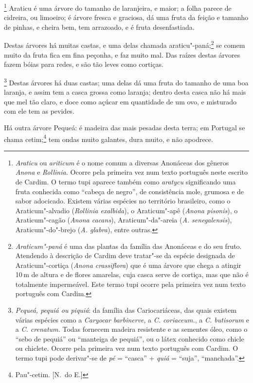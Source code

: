 \footnote{ \textit{Araticu} ou \textit{ariticum} é o
nome comum a diversas Anonáceas dos gêneros \textit{Anona} e 
\textit{Rollinia.} Ocorre pela primeira vez num texto português neste
escrito de Cardim. O termo tupi aparece também como \textit{aratycu}
significando uma fruta conhecida como ``cabeça de negro'', de
consistência mole, grumosa e de sabor adocicado. Existem várias
espécies no território brasileiro, como o Araticum"-alvadio
(\textit{Rollinia exalbida}), o Araticum"-apê (\textit{Anona pisonis}), 
o Araticum"-cagão (\textit{Anona cacans}), Araticum"-da"-areia
(\textit{A. senegalensis}), Araticum"-do"-brejo (\textit{A. glabra}), 
entre outras.} Araticu é uma árvore do tamanho de
laranjeira, e maior; a folha parece de cidreira, ou limoeiro; é árvore
fresca e graciosa, dá uma fruta da feição e tamanho de pinhas, e cheira
bem, tem arrazoado, e é fruta desenfastiada.

 Destas árvores há muitas castas, e uma delas chamada 
araticu"-paná;\footnote{ \textit{Araticum"-paná} é uma das plantas da família das
Anonáceas e do seu fruto. Atendendo à descrição de Cardim deve
tratar"-se da espécie designada de Araticum"-cortiça (\textit{Anona
crassiflora}) que é uma árvore que chega a atingir 10\,m de altura e de
flores amarelas, cuja casca serve de cortiça, mas que não é totalmente
impermeável. Este termo tupi ocorre pela primeira vez num texto
português com Cardim.} se comem muito da fruta fica em fina peçonha, e
faz muito mal. Das raízes destas árvores fazem bóias para redes, e são
tão leves como cortiças.

\footnote{ \textit{Pequeá, pequiá ou piquiá}: da
família das Cariocariáceas, das quais existem várias espécies como a 
\textit{Caryocar barbinerve}, a \textit{C. coriaceum.}, a \textit{C.
butisorum} e a \textit{C. crenatum.} Todas fornecem madeira resistente
e as sementes óleo, como o ``sebo de pequiá'' ou ``manteiga de pequiá'', ou
o látex conhecido como chicle ou chiclete. Ocorre pela primeira vez num
texto português com Cardim. O termo tupi pode derivar"-se de \textit{pé} = 
``casca'' + \textit{quiá} = ``suja'', ``manchada''.} Destas
árvores há duas castas; uma delas dá uma fruta do tamanho de uma boa
laranja, e assim tem a casca grossa como laranja; dentro desta casca
não há mais que mel tão claro, e doce como açúcar em quantidade de um
ovo, e misturado com ele tem as pevides.

 Há outra árvore Pequeá: é madeira das mais pesadas desta terra; em
Portugal se chama cetim;\footnote{ Pau"-cetim. [N.~do E.]} tem ondas muito galantes, dura muito, e não
apodrece.

